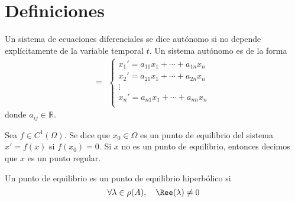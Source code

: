 \section{Definiciones}

\begin{defn}
  Un sistema de ecuaciones diferenciales se dice autónomo si no depende explícitamente de la variable temporal $t$. Un sistema autónomo es de la forma
  \[ 
     =
    \begin{aligned}
      \begin{cases}
        x_{1}' = a_{11} x_{1} + \cdots + a_{1n} x_{n} \\
        x_{2}' = a_{21} x_{1} + \cdots + a_{2n} x_{n} \\
        \vdots \\
        x_{n}' = a_{n1} x_{1} + \cdots + a_{nn} x_{n} \\
      \end{cases}
    \end{aligned} 
  \] 
  donde $a_{ij} \in \mathbb{R}$.
\end{defn}

\begin{defn}
  Sea $f \in C^{1}(\Omega)$. Se dice que $x_{0} \in \Omega$ es un punto de equilibrio del sistema $x' = f(x)$ si $f(x_{0}) = 0$. Si $x$ no es un punto de equilibrio, entonces decimos que $x$ es un punto regular.
\end{defn}

\begin{defn}
  Un punto de equilibrio es un punto de equilibrio hiperbólico si 
  \[ 
    \forall \lambda \in \rho(A), \quad \Ree(\lambda) \neq 0
  \] 
\end{defn}

%
%
%

